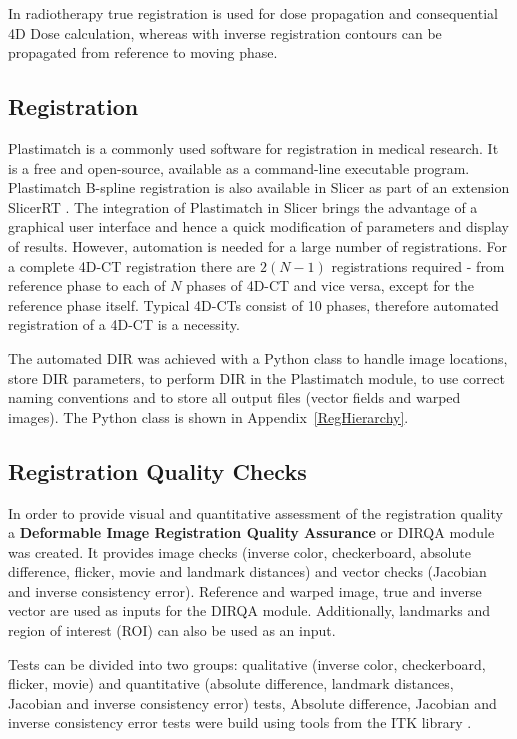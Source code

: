 \documentclass[type=dr, dr=rernat, accentcolor=tud7b,colorbacktitle, bigchapter, openright, twoside, 12pt ]{tudthesis}
\begin{document}
In radiotherapy true registration is used for dose propagation and consequential 4D Dose calculation, whereas with inverse registration contours can be propagated from reference to moving phase.

\subsection{Registration}
\label{RegistrationImplement}

Plastimatch \cite{Shackleford2010} is a commonly used software for registration in medical research. It is a free and open-source, available as a command-line executable program. 
Plastimatch B-spline registration is also available in Slicer as part of an extension SlicerRT \cite{Pinter2012}.
The integration of Plastimatch in Slicer brings the advantage of a graphical user interface and hence a quick modification of parameters and display of results. 
However, automation is needed for a large number of registrations. For a complete 4D-CT registration there are $2(N-1)$ registrations required - from reference phase to each of $N$ phases of 4D-CT and vice versa, except for the reference phase itself. 
Typical 4D-CTs consist of 10 phases, therefore automated registration of a 4D-CT is a necessity.

The automated DIR was achieved with a Python class to handle image locations, store DIR parameters, to perform DIR in the Plastimatch module, to use correct naming conventions and to store all output files (vector fields and warped images). 
The Python class is shown in Appendix~\ref{RegHierarchy}.


\subsection{Registration Quality Checks}
\label{DIRQA}

In order to provide visual and quantitative assessment of the registration quality a \textbf{Deformable Image Registration Quality Assurance} or DIRQA module was created. 
It provides image checks (inverse color, checkerboard, absolute difference, flicker, movie and landmark distances) 
and vector checks (Jacobian and inverse consistency error). 
Reference and warped image, true and inverse vector are used as inputs for the DIRQA module. 
Additionally, landmarks and region of interest (ROI) can also be used as an input.

Tests can be divided into two groups: qualitative (inverse color, checkerboard, flicker, movie) and quantitative 
(absolute difference, landmark distances, Jacobian and inverse consistency error) tests, Absolute difference, Jacobian and inverse consistency error tests
were build using tools from the ITK library \cite{Yoo2002}.
\end{document}
